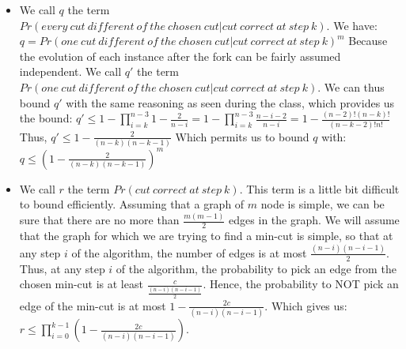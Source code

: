\begin{itemize}

\item We call $q$ the term $Pr(every\: cut\: different\: of\: the\: chosen\: cut | cut\: correct\: at\: step\ k)$.
\newline
We have:
\newline
$q=Pr(one\: cut\: different\: of\: the\: chosen\: cut| cut\: correct\: at\: step\ k)^m$
\newline
Because the evolution of each instance after the fork can be fairly assumed independent.
\newline
\newline
We call $q'$ the term $Pr(one\: cut\: different\: of\: the\: chosen\: cut| cut\: correct\: at\: step\ k)$.
\newline
We can thus bound $q'$ with the same reasoning as seen during the class, which provides us the bound:
\newline
$q' \leq 1 - \prod_{i=k}^{n-3}{1 - \frac{2}{n-i}} = 1 -  \prod_{i=k}^{n-3}{\frac{n-i-2}{n-i}} = 1 -  \frac{(n-2)!(n-k)!}{(n-k-2)!n!}$
\newline
Thus,
$q' \leq 1 - \frac{2}{(n-k)(n-k-1)}$
\newline
\newline
Which permits us to bound $q$ with:
\newline
$q \leq (1 - \frac{2}{(n-k)(n-k-1)})^m$

\item We call $r$ the term $Pr(cut\: correct\: at\: step\: k)$.
\newline
This term is a little bit difficult to bound efficiently.
\newline
Assuming that a graph of $m$ node is simple, we can be sure that there are no more than $\frac{m(m-1)}{2}$ edges in the graph. We will assume that the graph for which we are trying to find a min-cut is simple, so that at any step $i$ of the algorithm, the number of edges is at most $\frac{(n-i)(n-i-1)}{2}$.
\newline
Thus, at any step $i$ of the algorithm, the probability to pick an edge from the chosen min-cut is at least $\frac{c}{\frac{(n-i)(n-i-1)}{2}}$.
\newline
Hence, the probability to NOT pick an edge of the min-cut is at most $1-\frac{2c}{(n-i)(n-i-1)}$.
\newline
Which gives us:
\newline
$r \leq \prod_{i=0}^{k-1}{(1-\frac{2c}{(n-i)(n-i-1)})}$.
\newline


\end{itemize}
